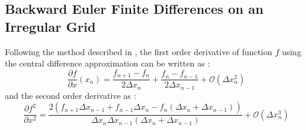 \documentclass[sn-vancouver, Numbered]{sn-jnl}
\begin{document}
\subsection{Backward Euler Finite Differences on an Irregular Grid}

Following the method described in \cite{Sundqvist1970}, the first order derivative of function $f$ using the central difference approximation can be written as :
\begin{equation}
\frac{\partial f}{\partial x} (x_n) = \frac{f_{n+1}- f_{n}}{2 \Delta x_n} + \frac{f_{n}- f_{n-1}}{2 \Delta x_{n-1}} + \mathcal{O}(\Delta x_n^2)
 \label{eq:1_deriv}
\end{equation}
and the second order derivative as :
\begin{equation}
	\frac{\partial f^2}{\partial x^2} = \dfrac{2 \left( f_{n+1} \Delta x_{n-1} + f_{n-1} \Delta x_{n} - f_n \left( \Delta x_{n} + \Delta x_{n-1}\right) \right) }{\Delta x_{n} \Delta x_{n-1} \left( \Delta x_{n} + \Delta x_{n-1}\right)} + \mathcal{O}(\Delta x_n^3)
 \label{eq:2_deriv}
\end{equation}
\end{document}
